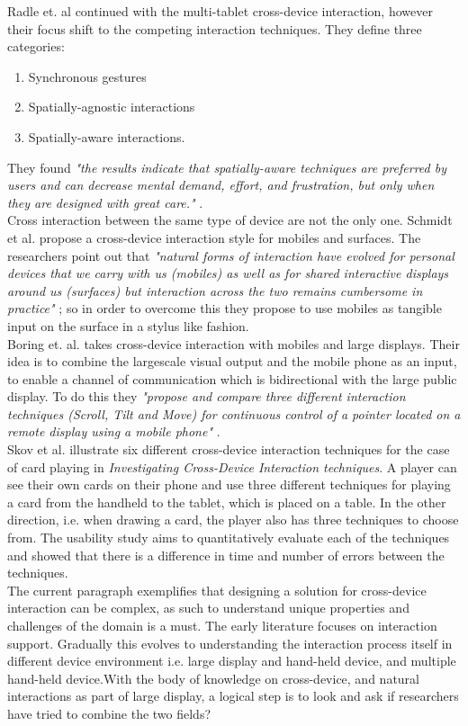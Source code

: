 Radle et. al continued with the multi-tablet cross-device interaction, however their focus shift to the competing interaction techniques. They define three categories: \begin{enumerate}
	\item Synchronous gestures
	\item Spatially-agnostic interactions
	\item Spatially-aware interactions. 
\end{enumerate} They found \emph{"the results indicate that spatially-aware techniques are preferred by users and can decrease mental demand, effort, and frustration, but only when they are designed with great care."} \cite{Radle:2015}.\\

Cross interaction between the same type of device are not the only one. Schmidt et al. propose a cross-device interaction style for mobiles and surfaces. The researchers point out that \emph{"natural forms of interaction have evolved for personal devices that we carry with us (mobiles) as well as for shared interactive displays around us (surfaces) but interaction across the two remains cumbersome in practice"} \cite{Schmidt:2012}; so in order to overcome this they propose to use mobiles as tangible input on the surface in a stylus like fashion.\\

Boring et. al. takes cross-device interaction with mobiles and large displays. Their idea is to combine the largescale visual output and the mobile phone as an input, to enable a channel of communication which is bidirectional with the large public display. To do this they \emph{"propose and compare three different interaction techniques (Scroll, Tilt and Move) for continuous control of a pointer located on a remote display using a mobile phone"} \cite{Boring:2009}.\\
Skov et al. \cite{Skov:2015} illustrate six different cross-device interaction techniques for the case of card playing in \emph{Investigating Cross-Device Interaction techniques}.
A player can see their own cards on their phone and use three different techniques for playing a card from the handheld to the tablet, which is placed on a table.
In the other direction, i.e. when drawing a card, the player also has three techniques to choose from.
The usability study aims to quantitatively evaluate each of the techniques and showed that there is a difference in time and number of errors between the techniques. \\

The current paragraph exemplifies that designing a solution for cross-device interaction can be complex, as such to understand  unique properties and challenges of the domain is a must. The early literature focuses on interaction support. Gradually this evolves to understanding the interaction process itself in different device environment i.e. large display and hand-held device, and multiple hand-held device.With the body of knowledge on cross-device, and natural interactions as part of large display, a logical step is to look and ask if researchers have tried to combine the two fields?
